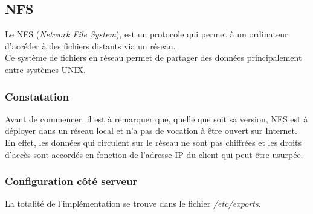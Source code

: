 \subsection{NFS}
\label{subsec:nfs}

Le NFS (\emph{Network File System}), est un protocole qui permet à un ordinateur
d'accéder à des fichiers distants via un réseau. \\
Ce système de fichiers en réseau permet de partager des données principalement
entre systèmes UNIX.

\subsubsection{Constatation}
\label{subsubsec:constatation}

Avant de commencer, il est à remarquer que, quelle que soit sa version, NFS est
à déployer dans un réseau local et n'a pas de vocation à être ouvert sur
Internet. \\ En effet, les données qui circulent sur le réseau ne sont pas
chiffrées et les droits d'accès sont accordés en fonction de l'adresse IP du
client qui peut être usurpée.

\subsubsection{Configuration côté serveur}
\label{subsubsec:config-serveur}

La totalité de l'implémentation se trouve dans le fichier
\textit{/etc/exports}.


